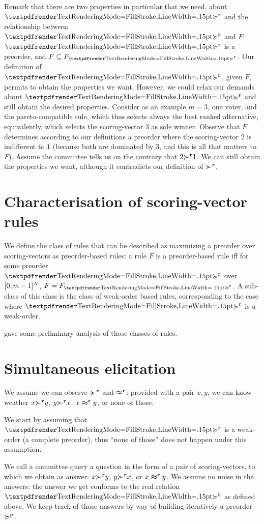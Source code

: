 \documentclass[version=last, pagesize, twoside=off, bibliography=totoc, DIV=calc, fontsize=14pt, a4paper, french, english]{scrartcl}
\begin{document}

Remark that there are two properties in particular that we need, about $\prefsv$ and the relationship between $\prefsv$ and $F$: $\prefsv$ is a preorder, and $F \subseteq F_{\prefsv}$. Our definition of $\prefsv$, given $F$, permits to obtain the properties we want. However, we could relax our demands about $\prefsv$ and still obtain the desired properties. Consider as an example $m = 3$, one voter, and the pareto-compatible rule, which thus selects always the best ranked alternative, equivalently, which selects the scoring-vector $3$ as sole winner. Observe that $F$ determines according to our definitions a preorder where the scoring-vector $2$ is indifferent to $1$ (because both are dominated by $3$, and this is all that matters to $F$). Assume the committee tells us on the contrary that $2 {\boldsymbol{\succ}^\textbf{r}} 1$. We can still obtain the properties we want, although it contradicts our definition of ${\boldsymbol{\succ}^\textbf{r}}$.

\section{Characterisation of scoring-vector rules}
We define the class of rules that can be described as maximizing a preorder over scoring-vectors as preorder-based rules: a rule $F$ is a preorder-based rule iff for some preorder $\prefsv$ over $[0, m-1]^N$, $F = F_{\prefsv}$. A sub-class of this class is the class of weak-order based rules, corresponding to the case where $\prefsv$ is a weak-order.

\citet{cailloux_eliciting_2014} gave some preliminary analysis of those classes of rules.


\section{Simultaneous elicitation}
We assume we can observe ${\boldsymbol{\succ}^\textbf{r}}$ and $\boldsymbol{\approx}^\textbf{r}$: provided with a pair $x, y$, we can know weather $x {\boldsymbol{\succ}^\textbf{r}} y$, $y {\boldsymbol{\succ}^\textbf{r}} x$, $x \boldsymbol{\approx}^\textbf{r} y$, or none of those.

We start by assuming that $\prefsv$ is a weak-order (a complete preorder), thus “none of those” does not happen under this assumption.

We call a committee query a question in the form of a pair of scoring-vectors, to which we obtain as answer: $x {\boldsymbol{\succ}^\textbf{r}} y$, $y {\boldsymbol{\succ}^\textbf{r}} x$, or $x \boldsymbol{\approx}^\textbf{r} y$. We assume no noise in the answers: the answer we get conforms to the real relation $\prefsv$ as defined above.
We keep track of those answers by way of building iteratively a preorder $\succcurlyeq^\text{p}$.
\end{document}
